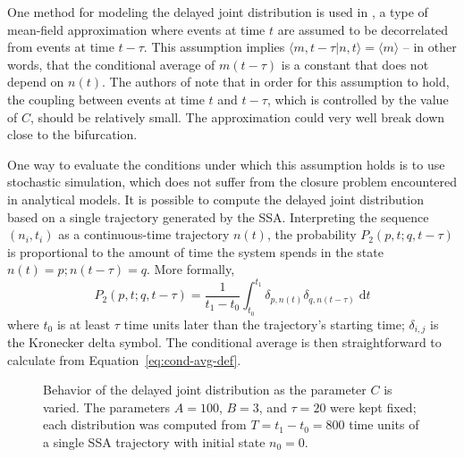\documentclass[english,letterpaper,12pt]{report}
\newcommand{\dee}{\;\mathrm{d}}
\begin{document}
\begin{doublespacing}
One method for modeling the delayed joint distribution is used in \cite{delay-oscillations}, a type of mean-field approximation where events at time $t$ are assumed to be decorrelated from events at time $t - \tau$. This assumption implies $\langle m, t - \tau | n, t \rangle = \langle m \rangle$ -- in other words, that the conditional average of $m(t - \tau)$ is a constant that does not depend on $n(t)$. The authors of \cite{delay-oscillations} note that in order for this assumption to hold, the coupling between events at time $t$ and $t - \tau$, which is controlled by the value of $C$, should be relatively small. The approximation could very well break down close to the bifurcation.

One way to evaluate the conditions under which this assumption holds is to use stochastic simulation, which does not suffer from the closure problem encountered in analytical models. It is possible to compute the delayed joint distribution based on a single trajectory generated by the SSA. Interpreting the sequence $(n_i, t_i)$ as a continuous-time trajectory $n(t)$, the probability $P_2(p, t; q, t - \tau)$ is proportional to the amount of time the system spends in the state $n(t) = p; n(t - \tau) = q$. More formally,
\begin{equation}
    P_2(p, t; q, t - \tau) = \frac{1}{t_1 - t_0} \int_{t_0}^{t_1} \delta_{p, n(t)} \delta_{q, n(t - \tau)} \dee t
    \label{eq:joint-pdist-calc}
\end{equation}
where $t_0$ is at least $\tau$ time units later than the trajectory's starting time; $\delta_{i,j}$ is the Kronecker delta symbol. The conditional average is then straightforward to calculate from Equation~\eqref{eq:cond-avg-def}.

\begin{figure}[tb]
    \caption{Behavior of the delayed joint distribution as the parameter $C$ is varied. The parameters $A=100$, $B=3$, and $\tau=20$ were kept fixed; each distribution was computed from $T = t_1 - t_0 = 800$ time units of a single SSA trajectory with initial state $n_0 = 0$.}
    \label{fig:ddjd-sweep}
\end{figure}


\end{doublespacing}
\end{document}
